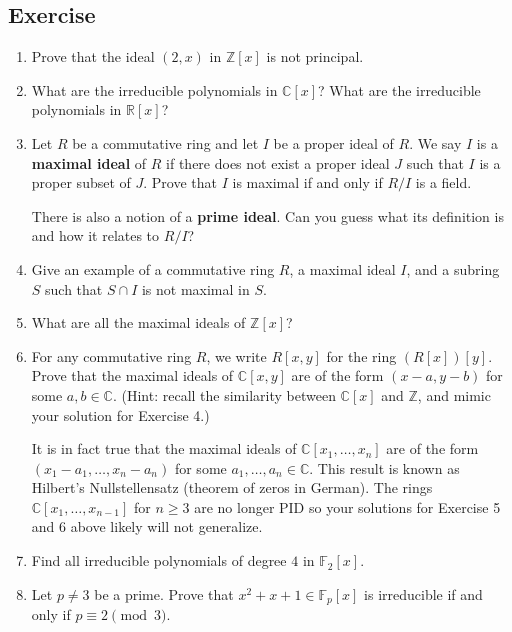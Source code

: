 \documentclass{article}
\def\Z{{\mathbb Z}}
\def\R{{\mathbb R}}
\def\F{{\mathbb F}}
\def\Z{{\mathbb Z}}
\def\F{{\mathbb F}}
\def\C{{\mathbb C}}
\begin{document}
\subsection*{Exercise}
\begin{enumerate}[\thesection .1]
    \item Prove that the ideal $(2,x)$ in $\Z[x]$ is not principal.
    \item What are the irreducible polynomials in $\C[x]$? What are the irreducible polynomials in $\R[x]$?
    \item Let $R$ be a commutative ring and let $I$ be a proper ideal of $R$. We say $I$ is a \textbf{maximal ideal} of $R$ if there does not exist a proper ideal $J$ such that $I$ is a proper subset of $J$. Prove that $I$ is maximal if and only if $R/I$ is a field.

    There is also a notion of a \textbf{prime ideal}. Can you guess what its definition is and how it relates to $R/I$?
    \item Give an example of a commutative ring $R$, a maximal ideal $I$, and a subring $S$ such that $S\cap I$ is not maximal in $S$.\label{exer:9.4}
    \item What are all the maximal ideals of $\Z[x]$?

    \item For any commutative ring $R$, we write $R[x,y]$ for the ring $(R[x])[y]$. Prove that the maximal ideals of $\C[x,y]$ are of the form $(x-a, y-b)$ for some $a,b\in\C$. (Hint: recall the similarity between $\C[x]$ and $\Z$, and mimic your solution for Exercise 4.)

    It is in fact true that the maximal ideals of $\C[x_1,\ldots,x_n]$ are of the form $(x_1-a_1,\ldots,x_n-a_n)$ for some $a_1,\ldots,a_n\in\C$. This result is known as Hilbert's Nullstellensatz (theorem of zeros in German). The rings $\C[x_1,\ldots,x_{n-1}]$ for $n\geq 3$ are no longer PID so your solutions for Exercise 5 and 6 above likely will not generalize.
    
    \item Find all irreducible polynomials of degree $4$ in $\F_2[x]$.
    \item Let $p\neq 3$ be a prime. Prove that $x^2 + x + 1\in \F_p[x]$ is irreducible if and only if $p\equiv2\pmod{3}$.\label{exer:9.8}
\end{enumerate}
\end{document}
